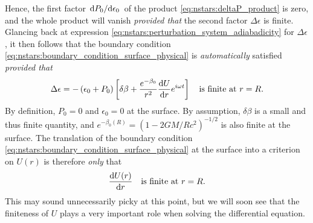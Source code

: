 Hence, the first factor $\odv{P_0}/{\epsilon_0}$ of the product \eqref{eq:nstars:deltaP_product} is zero, and the whole product will vanish \emph{provided that} the second factor $\Delta \epsilon$ is finite.
Glancing back at expression \eqref{eq:nstars:perturbation_system_adiabadicity} for $\Delta \epsilon$, it then follows that the boundary condition \eqref{eq:nstars:boundary_condition_surface_physical} is \emph{automatically} satisfied \emph{provided that}
\begin{equation}
	\Delta \epsilon = - \left( \epsilon_0 + P_0 \right) \left[ \delta\beta + \frac{e^{-\beta_0}}{r^2} \odv{U}{r} e^{i \omega t} \right] \quad \text{is finite at $r=R$}.
\end{equation}
By definition, $P_0 = 0$ and $\epsilon_0=0$ at the surface.
By assumption, $\delta\beta$ is a small and thus finite quantity, and $e^{-\beta_0(R)} = \left( 1 - 2 G M / R c^2 \right)^{-1/2}$ is also finite at the surface.
The translation of the boundary condition \eqref{eq:nstars:boundary_condition_surface_physical} at the surface into a criterion on $U(r)$ is therefore \emph{only} that
\begin{equation}
	\odv{U(r)}{r} \quad \text{is finite at $r=R$}.
\label{eq:nstars:boundary_condition_surface_mathematical}
\end{equation}
This may sound unnecessarily picky at this point, but we will soon see that the finiteness of $U$ plays a very important role when solving the differential equation.

